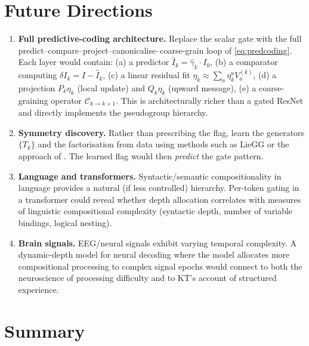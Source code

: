 \documentclass[11pt,a4paper]{article}
\begin{document}
\section{Future Directions}\label{sec:future}

\begin{enumerate}
\item \textbf{Full predictive-coding architecture.}\quad
  Replace the scalar gate with the full
  predict--compare--project--canonicalise--coarse-grain
  loop of \eqref{eq:predcoding}.
  Each layer would contain:
  (a) a predictor $\hat{I}_k = \hat\gamma_k\cdot I_0$,
  (b) a comparator computing $\delta I_k = I - \hat{I}_k$,
  (c) a linear residual fit
  $\eta_k \approx \sum_a \eta_k^a V_a^{(k)}$,
  (d) a projection $P_k\eta_k$ (local update)
  and $Q_k\eta_k$ (upward message),
  (e) a coarse-graining operator $\mathcal{C}_{k\to k+1}$.
  This is architecturally richer than a gated ResNet and
  directly implements the pseudogroup hierarchy.

\item \textbf{Symmetry discovery.}\quad
  Rather than prescribing the flag,
  learn the generators $\{T_k\}$ and the factorisation
  from data using methods such as LieGG \citep{Moskalev2022}
  or the approach of \citet{Hu2024}.
  The learned flag would then \emph{predict} the gate pattern.

\item \textbf{Language and transformers.}\quad
  Syntactic/semantic compositionality in language provides
  a natural (if less controlled) hierarchy.
  Per-token gating in a transformer could reveal whether
  depth allocation correlates with measures of
  linguistic compositional complexity
  (syntactic depth, number of variable bindings,
  logical nesting).

\item \textbf{Brain signals.}\quad
  EEG/neural signals exhibit varying temporal complexity.
  A dynamic-depth model for neural decoding where the model
  allocates more compositional processing to complex signal
  epochs would connect to both the neuroscience of
  processing difficulty and to KT's account of
  structured experience.
\end{enumerate}


\section{Summary}
\end{document}
